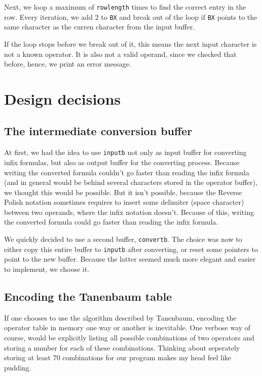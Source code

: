 \documentclass[11pt]{article}
\begin{document}
Next, we loop a maximum of \verb|rowlength| times to find the correct entry in the row. Every iteration, we add 2 to \verb|BX| and break out of the loop if \verb|BX| points to the same character as the curren character from the input buffer.

If the loop stops before we break out of it, this means the next input character is not a known operator. It is also not a valid operand, since we checked that before, hence, we print an error message.


\section{Design decisions}

\subsection{The intermediate conversion buffer}

At first, we had the idea to use \verb|inputb| not only as input buffer for converting infix formulas, but also as output buffer for the converting process. Because writing the converted formula couldn't go faster than reading the infix formula (and in general would be behind several characters stored in the operator buffer), we thought this would be possible. But it isn't possible, because the Reverse Polish notation sometimes requires to insert some delimiter (space character) between two operands, where the infix notation doesn't. Because of this, writing the converted formula could go faster than reading the infix formula.

We quickly decided to use a second buffer, \verb|convertb|. The choice was now to either copy this entire buffer to \verb|inputb| after converting, or reset some pointers to point to the new buffer. Because the latter seemed much more elegant and easier to implement, we choose it.

\subsection{Encoding the Tanenbaum table}

If one chooses to use the algorithm described by Tanenbaum, encoding the operator table in memory one way or another is inevitable. One verbose way of course, would be explicitly listing all possible combinations of two operators and storing a number for each of these combinations. Thinking about seperately storing at least 70 combinations for our program makes my head feel like pudding.
\end{document}
